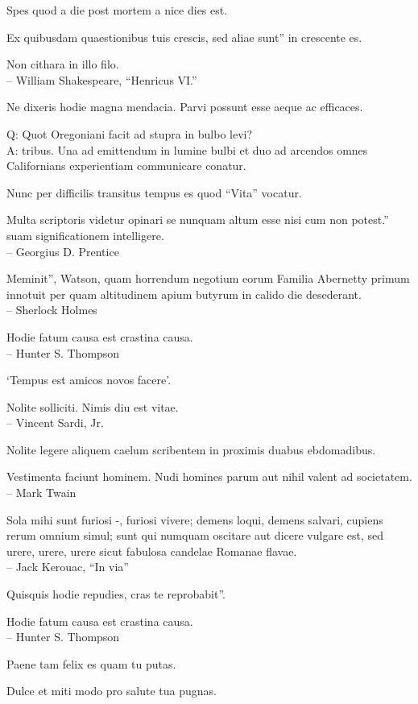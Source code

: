 \documentclass[titlepage,12pt]{memoir}
\begin{document}
Spes quod a die post mortem a nice dies est.

Ex quibusdam quaestionibus tuis crescis, sed aliae sunt”
in crescente es.

Non cithara in illo filo.
\\-- William Shakespeare, “Henricus VI.”

Ne dixeris hodie magna mendacia. Parvi possunt esse aeque ac efficaces.

Q: Quot Oregoniani facit ad stupra in bulbo levi?\\
A: tribus. Una ad emittendum in lumine bulbi et duo ad arcendos omnes
Californians experientiam communicare conatur.

Nunc per difficilis transitus tempus es quod “Vita” vocatur.

Multa scriptoris videtur opinari se nunquam altum esse nisi cum non potest.”
suam significationem intelligere.
\\-- Georgius D. Prentice

Meminit”, Watson, quam horrendum negotium eorum
Familia Abernetty primum innotuit per quam altitudinem
apium butyrum in calido die desederant.
\\-- Sherlock Holmes

Hodie fatum causa est crastina causa.
\\-- Hunter S. Thompson

‘Tempus est amicos novos facere’.

Nolite solliciti. Nimis diu est vitae.
\\-- Vincent Sardi, Jr.

Nolite legere aliquem caelum scribentem in proximis duabus ebdomadibus.

Vestimenta faciunt hominem. Nudi homines parum aut nihil valent ad societatem.
\\-- Mark Twain

Sola mihi sunt furiosi -, furiosi vivere;
demens loqui, demens salvari, cupiens rerum omnium simul;
sunt qui numquam oscitare aut dicere vulgare est, sed urere, urere, urere
sicut fabulosa candelae Romanae flavae.
\\-- Jack Kerouac, “In via”

Quisquis hodie repudies, cras te reprobabit”.

Hodie fatum causa est crastina causa.
\\-- Hunter S. Thompson

Paene tam felix es quam tu putas.

Dulce et miti modo pro salute tua pugnas.
\end{document}
